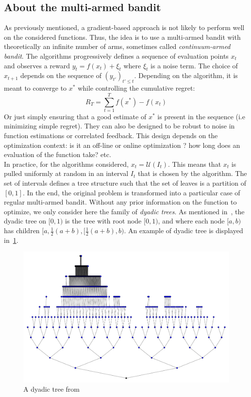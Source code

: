 \documentclass[a4paper,10pt]{article}
\begin{document}
\subsection{About the multi-armed bandit}
\label{mab}
As previously mentioned, a gradient-based approach is not likely to perform well on the considered functions. Thus, the idea is to use a multi-armed bandit with theoretically an infinite number of arms, sometimes called \textit{continuum-armed bandit}. The algorithms progressively defines a sequence of evaluation points $x_t$ and observes a reward $y_t=f(x_t)+\xi_t$ where $\xi_t$ is a noise term. The choice of $x_{t+1}$ depends on the sequence of $(y_{t'})_{t'\le t}$. Depending on the algorithm, it is meant to converge to $x^*$ while controlling the cumulative regret:
\begin{equation}
\label{regret}
R_T = \underset{t=1}{\overset{T}{\sum}}f(x^*)-f(x_t)
\end{equation}
Or just simply ensuring that a good estimate of $x^*$ is present in the sequence (i.e minimizing simple regret). They can also be designed to be robust to noise in function estimations or correlated feedback. This design depends on the optimization context: is it an off-line or online optimization ? how long does an evaluation of the function take? etc.\\
In practice, for the algorithms considered, $x_t = \mathcal{U}(I_t)$. This means that $x_t$ is pulled uniformly at random in an interval $I_t$ that is chosen by the algorithm. The set of intervals defines a tree structure such that the set of leaves is a partition of $[0,1]$. In the end, the original problem is transformed into a particular case of regular multi-armed bandit. Without any prior information on the function to optimize, we only consider here the family of \textit{dyadic trees}. As mentioned in~\cite{bull2013adaptive}, the dyadic tree on $[0, 1)$ is the tree with root node $[0, 1)$, and where each node $[a, b)$ has children $[a, \frac{1}{2}(a+b), [ \frac{1}{2}(a+b), b)$. An example of dyadic tree is displayed in~\ref{dydtree}.

\begin{figure}
\label{dydtree}
\centering
\includegraphics[scale=0.3]{tree.pdf}
\caption{A dyadic tree from~\cite{bull2013adaptive}}
\end{figure}
\end{document}
